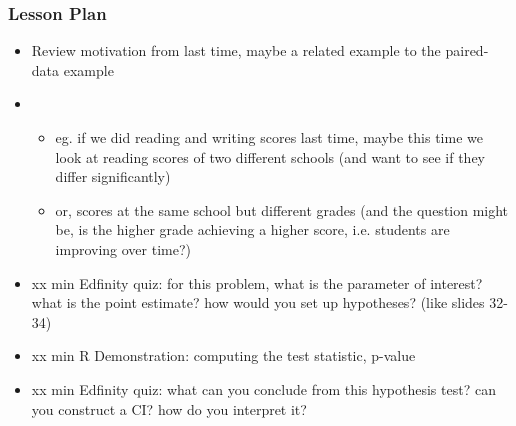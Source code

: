 \begin{frame}
    \frametitle{Lesson Plan}
    \begin{itemize}
        \item Review motivation from last time, maybe a related example to the paired-data example
        \item \begin{itemize}
            \item eg. if we did reading and writing scores last time, maybe this time we look at reading scores of two different schools (and want to see if they differ significantly)
            \item or, scores at the same school but different grades (and the question might be, is the higher grade achieving a higher score, i.e. students are improving over time?)
        \end{itemize}
        \item xx min Edfinity quiz: for this problem, what is the parameter of interest? what is the point estimate? how would you set up hypotheses? (like slides 32-34)
        \item xx min R Demonstration: computing the test statistic, p-value 
        \item xx min Edfinity quiz: what can you conclude from this hypothesis test? can you construct a CI? how do you interpret it?
    \end{itemize}
\end{frame}

